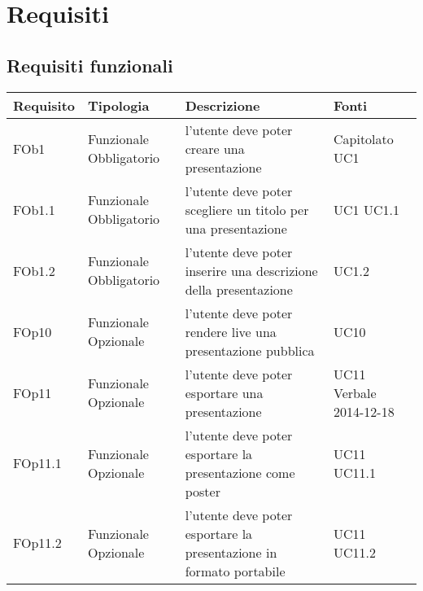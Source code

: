 
\section{Requisiti}
\subsection{ Requisiti funzionali}
	
\begin{longtable}{|l|p{2.5cm}|p{5cm}|p{3.5cm}|}
\hline
\textbf{Requisito} & \textbf{Tipologia} & \textbf{Descrizione} & \textbf{Fonti} \\
\hline
FOb1 & Funzionale \linebreak Obbligatorio & l'utente deve poter creare una presentazione & Capitolato \linebreak UC1 \linebreak \\
\hline
FOb1.1 & Funzionale \linebreak Obbligatorio & l'utente deve poter scegliere un titolo per una presentazione & UC1 \linebreak  UC1.1 \linebreak  \\
\hline
FOb1.2 & Funzionale \linebreak Obbligatorio & l'utente deve poter inserire una descrizione della presentazione & UC1.2 \linebreak  \\
\hline
FOp10 & Funzionale \linebreak Opzionale & l'utente deve poter rendere live una presentazione pubblica & UC10 \linebreak \\
\hline
FOp11 & Funzionale \linebreak Opzionale & l'utente deve poter esportare una presentazione & UC11 \linebreak Verbale 2014-12-18 \linebreak \\
\hline
FOp11.1 & Funzionale \linebreak Opzionale & l'utente deve poter esportare la presentazione come poster & UC11 \linebreak  UC11.1 \linebreak  \\
\hline
FOp11.2 & Funzionale \linebreak Opzionale & l'utente deve poter esportare la presentazione in formato portabile & UC11 \linebreak  UC11.2 \linebreak  \\

\end{longtable}
